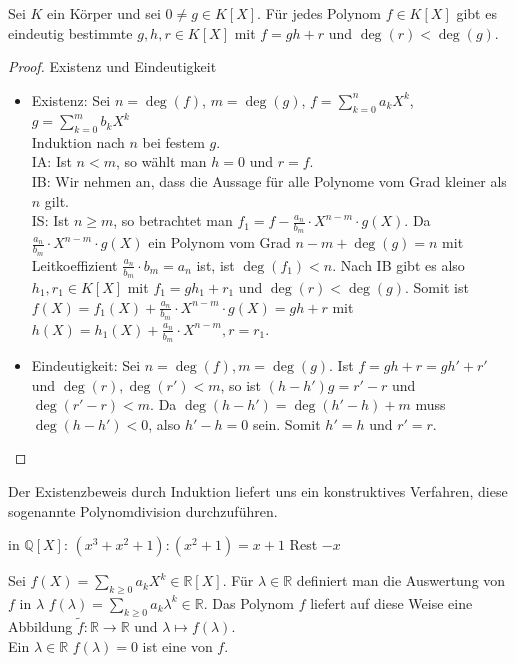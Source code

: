 \begin{theorem}[Polynomdivision]
	Sei $K$ ein Körper und sei $0 \neq g \in K[X]$. Für jedes Polynom
	$f \in K[X]$ gibt es eindeutig bestimmte $g,h,r \in K[X]$ mit $f=gh+r$ und $\deg(r)<\deg(g)$. 
\end{theorem}
\begin{proof}
	Existenz und Eindeutigkeit
	\begin{itemize}
		\item Existenz: Sei $n=\deg(f)$, $m=\deg(g)$, $f=\sum _{k=0}^{n} a_kX^k$, $g=\sum _{k=0}^{m} b_kX^k$ \\
		Induktion nach $n$ bei festem $g$. \\
		IA: Ist $n<m$, so wählt man $h=0$ und $r=f$.\\
		IB: Wir nehmen an, dass die Aussage für alle Polynome vom Grad kleiner als $n$ gilt.\\
		IS: Ist $n \ge m$, so betrachtet man $f_1=f-\frac{a_n}{b_m}\cdot X^{n-m}\cdot g(X)$. Da $\frac{a_n}{b_m}\cdot 
		X^{n-m}\cdot g(X)$ ein Polynom vom Grad $n-m+\deg(g)=n$ mit Leitkoeffizient $\frac{a_n}{b_m}\cdot b_m=a_n$ ist, ist
		$\deg(f_1)<n$. Nach IB gibt es also $h_1, r_1 \in K[X]$ mit $f_1=gh_1+r_1$ und $\deg(r)<\deg(g)$. Somit ist 
		$f(X)=f_1(X)+\frac{a_n}{b_m}\cdot X^{n-m}\cdot g(X)=gh+r$ mit $h(X)=h_1(X)+\frac{a_n}{b_m}\cdot X^{n-m}, r=r_1$.
		\item Eindeutigkeit: Sei $n=\deg(f), m=\deg(g)$. Ist $f=gh+r=gh'+r'$ und $\deg(r),\deg(r')<m$, so ist $(h-h')g=r'-r$ und
		$\deg(r'-r)<m$. Da $\deg(h-h')=\deg(h'-h)+m$ muss $\deg(h-h')<0$, also $h'-h=0$ sein. Somit $h'=h$ und $r'=r$.
	\end{itemize}
\end{proof}

\begin{remark}
	Der Existenzbeweis durch Induktion liefert uns ein konstruktives Verfahren, diese sogenannte
	Polynomdivision durchzuführen.
\end{remark}

\begin{*example}
	in $\mathbb Q[X]$: $(x^3+x^2+1):(x^2+1)=x+1$ Rest $-x$
\end{*example}

\begin{definition}[Nullstelle]
	Sei $f(X)=\sum_{k \ge 0} a_kX^k \in \mathbb R[X]$. Für $\lambda \in
	\mathbb R$ definiert man die Auswertung von $f$ in $\lambda$ $f(\lambda)=\sum_{k \ge 0} a_k\lambda^k
	\in \mathbb R$. Das Polynom $f$ liefert auf diese Weise eine Abbildung $\tilde f: \mathbb R \to \mathbb R$ und
	$\lambda \mapsto f(\lambda)$. \\
	Ein $\lambda \in \mathbb R$ $f(\lambda)=0$ ist eine  von $f$.
\end{definition}

